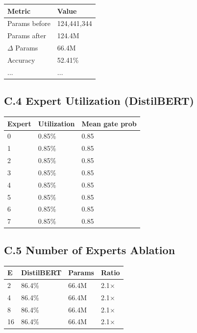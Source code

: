 \begin{table}[H]
\centering
\small
\begin{tabular}{ll}
\toprule
\textbf{Metric} & \textbf{Value} \\
\midrule
Params before & 124,441,344 \\
Params after & 124.4M \\
$\Delta$ Params & 66.4M \\
Accuracy & 52.41\% \\
... & ... \\
\bottomrule
\end{tabular}
\end{table}

\subsection{C.4 Expert Utilization (DistilBERT)}

\begin{table}[H]
\centering
\small
\begin{tabular}{lll}
\toprule
\textbf{Expert} & \textbf{Utilization} & \textbf{Mean gate prob} \\
\midrule
0 & 0.85\% & 0.85 \\
1 & 0.85\% & 0.85 \\
2 & 0.85\% & 0.85 \\
3 & 0.85\% & 0.85 \\
4 & 0.85\% & 0.85 \\
5 & 0.85\% & 0.85 \\
6 & 0.85\% & 0.85 \\
7 & 0.85\% & 0.85 \\
\bottomrule
\end{tabular}
\end{table}

\subsection{C.5 Number of Experts Ablation}

\begin{table}[H]
\centering
\small
\begin{tabular}{llll}
\toprule
\textbf{E} & \textbf{DistilBERT} & \textbf{Params} & \textbf{Ratio} \\
\midrule
2 & 86.4\% & 66.4M & 2.1$\times$ \\
4 & 86.4\% & 66.4M & 2.1$\times$ \\
8 & 86.4\% & 66.4M & 2.1$\times$ \\
16 & 86.4\% & 66.4M & 2.1$\times$ \\
\bottomrule
\end{tabular}
\end{table}


